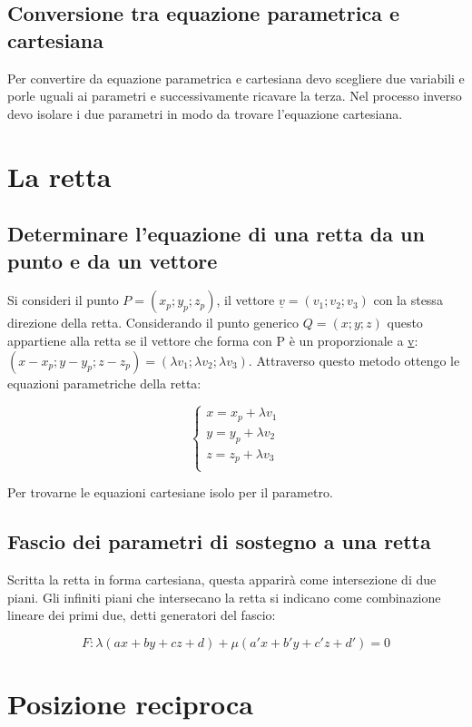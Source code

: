 \subsection{Conversione tra equazione parametrica e cartesiana}
Per convertire da equazione parametrica e cartesiana devo scegliere due variabili e porle uguali ai parametri e successivamente ricavare la terza. Nel processo inverso devo 
isolare i due parametri in modo da trovare l'equazione cartesiana.
\section{La retta}
\subsection{Determinare l'equazione di una retta da un punto e da un vettore}
Si consideri il punto $P=(x_p;y_p;z_p)$, il vettore $\underline{v}=(v_1;v_2;v_3)$ con la stessa direzione della retta. Considerando il punto generico $Q=(x;y;z)$ questo 
appartiene alla retta se il vettore che forma con P \`e un proporzionale a \underline{v}: $(x-x_p;y-y_p;z-z_p)=(\lambda v_1;\lambda v_2;\lambda v_3)$. Attraverso questo 
metodo ottengo le equazioni parametriche della retta:
\begin{center}
\begin{equation}
\begin{cases}
x=x_p+\lambda v_1\\
y=y_p+\lambda v_2\\
z=z_p+\lambda v_3\\
\end{cases}
\end{equation}
\end{center}
Per trovarne le equazioni cartesiane isolo per il parametro.
\subsection{Fascio dei parametri di sostegno a una retta}
Scritta la retta in forma cartesiana, questa apparir\`a come intersezione di due piani. Gli infiniti piani che intersecano la retta si indicano come combinazione lineare dei
primi due, detti generatori del fascio:
\begin{center}
\begin{equation}
F:\lambda(ax+by+cz+d)+\mu(a'x+b'y+c'z+d')=0
\end{equation}
\end{center}
\section{Posizione reciproca}
